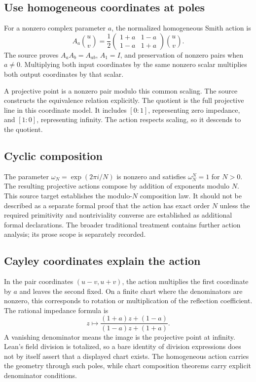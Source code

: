 \subsection{Use homogeneous coordinates at poles}
For a nonzero complex parameter $a$, the normalized homogeneous Smith action is
\[
A_a\binom uv=\frac12
\begin{pmatrix}1+a&1-a\\1-a&1+a\end{pmatrix}\binom uv.
\]
The source proves $A_aA_b=A_{ab}$, $A_1=I$, and preservation of nonzero pairs when $a\ne0$. Multiplying both input coordinates by the same nonzero scalar multiplies both output coordinates by that scalar.

A projective point is a nonzero pair modulo this common scaling. The source constructs the equivalence relation explicitly.
The quotient is the full projective line in this coordinate model. It includes $[0:1]$, representing zero impedance, and $[1:0]$, representing infinity. The action respects scaling, so it descends to the quotient.

\subsection{Cyclic composition}
The parameter $\omega_N=\exp(2\pi i/N)$ is nonzero and satisfies $\omega_N^N=1$ for $N>0$. The resulting projective actions compose by addition of exponents modulo $N$.
This source target establishes the modulo-$N$ composition law. It should not be described as a separate formal proof that the action has exact order $N$ unless the required primitivity and nontriviality converse are established as additional formal declarations. The broader traditional treatment contains further action analysis; its prose scope is separately recorded.

\subsection{Cayley coordinates explain the action}
In the pair coordinates $(u-v,u+v)$, the action multiplies the first coordinate by $a$ and leaves the second fixed.
On a finite chart where the denominators are nonzero, this corresponds to rotation or multiplication of the reflection coefficient. The rational impedance formula is
\[
z\longmapsto\frac{(1+a)z+(1-a)}{(1-a)z+(1+a)}.
\]
A vanishing denominator means the image is the projective point at infinity. Lean's field division is totalized, so a bare identity of division expressions does not by itself assert that a displayed chart exists. The homogeneous action carries the geometry through such poles, while chart composition theorems carry explicit denominator conditions.

